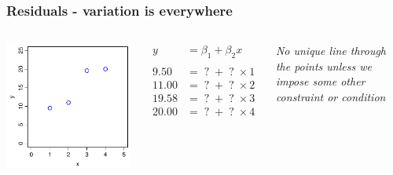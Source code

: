 \documentclass[aspectratio=43]{beamer}
\begin{document}
\frame
{\frametitle{Residuals - variation is everywhere}

\begin{columns}[T]

		\includegraphics[width=\textwidth]{Error.pdf}
		
		\begin{align*}
		  y  &= \beta_1 + \beta_2 x \\
		  \\
		  9.50  &= \;?\; + \;?\; \times 1 \\
		  11.00 &= \;?\; + \;?\; \times 2 \\
		  19.58 &= \;?\; + \;?\; \times 3 \\
		  20.00 &= \;?\; + \;?\; \times 4   
		\end{align*}
		
		\begin{center}
		 {\it No unique line through the points unless we impose some other 
		 constraint or condition}
		\end{center}
		 
\end{columns}
}
\end{document}
